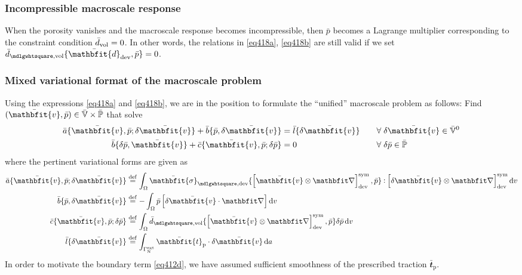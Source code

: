 \documentclass[12pt,a4paper,fleqn]{article}
\renewcommand{\ta}[1]{\mathbfit{#1}}
\renewcommand{\ts}[1]{\mathbfit{#1}}
\renewcommand{\Box}{\mdlgwhtsquare}
\newcommand{\prescribed}{\mathrm{p}}
\newcommand{\external}{\mathrm{ext}}
\begin{document}
\subsubsection{Incompressible macroscale response}

When the porosity vanishes and the macroscale response becomes incompressible, then $\bar{p}$ becomes a Lagrange multiplier corresponding to the constraint condition $\bar{d}_{\mathrm{vol}} = 0$. In other words, the relations in \eqref{eq418a}, \eqref{eq418b} are still valid if we set $\bar{d}_{\Box,\vol}\{\bar{\ts d}_\dev,\bar p\} = 0$.

\subsubsection{Mixed variational format of the macroscale problem}

Using the expressions \eqref{eq418a} and \eqref{eq418b}, we are in the position to formulate the ``unified'' macroscale problem as follows: Find $(\bar{\ta v},\bar p) \in\bar{\set V}\times\bar{\set{P}}$ that solve
\begin{subequations}\label{eq411}
\begin{align}
 \bar a\{\bar{\ta v},\bar p; \delta\bar{\ta v}\} + \bar b\{\bar p, \delta\bar{\ta v}\} &= \bar l\{\delta\bar{\ta v}\}   &&\quad \forall\; \delta\bar{\ta v} \in \bar{\set{V}}^0
 \label{eq411a}\\
 \bar b\{\delta\bar p, \bar{\ta v}\} + \bar c\{\bar{\ta v}, \bar p; \delta\bar p\}&= 0   &&\quad \forall\; \delta\bar p \in \bar{\set{P}}
 \label{eq411b}
\end{align}
\end{subequations}
where the pertinent variational forms are given as
\begin{align}
 \bar a\{\bar{\ta v},\bar p; \delta\bar{\ta v}\} &\defeq \int_\Omega \bar{\ts\sigma}_{\Box,\dev}\{\left[\bar{\ta v}\outerp \diff\right]^\sym_\dev,\bar p\}\dprod \left[\delta\bar{\ta v}\outerp \diff\right]^\sym_\dev \dif v
 \label{eq412a}\\
 \bar b\{\bar p, \delta\bar{\ta v}\}             &\defeq -\int_\Omega \bar p\left[\delta\bar{\ta v}\cdot\diff\right]\dif v
 \label{eq412b}\\
 \bar c\{\bar{\ta v}, \bar p; \delta\bar p\}     &\defeq \int_\Omega \bar d_{\Box,\vol}\{\left[\bar{\ta v}\outerp \diff\right]^\sym_\dev,\bar p\}\delta\bar p\dif v
 \label{eq412c}\\
 \bar l\{\delta\bar {\ta v}\}               &\defeq \int_{\Gamma^\external_\Neumann} \bar{\ta t}_\prescribed\cdot \delta\bar{\ta v} \dif a
 \label{eq412d}
\end{align}
In order to motivate the boundary term \eqref{eq412d}, we have assumed sufficient smoothness of the prescribed traction $\bar{\ta t}_\prescribed$.
\end{document}
